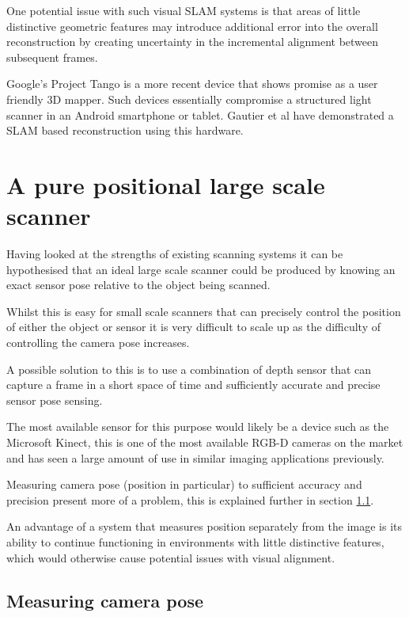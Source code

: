 \documentclass{entcs}
\begin{document}
One potential issue with such visual SLAM systems is that areas of little
distinctive geometric features may introduce additional error into the overall
reconstruction by creating uncertainty in the incremental alignment between
subsequent frames.

Google's Project Tango \cite{ProjectTango} is a more recent device that shows
promise as a user friendly 3D mapper. Such devices essentially compromise a
structured light scanner in an Android smartphone or tablet. Gautier et al
\cite{Gautier2016} have demonstrated a SLAM based reconstruction using this
hardware.

\section{A pure positional large scale scanner}
\label{sec:pure_positional}

Having looked at the strengths of existing scanning systems it can be
hypothesised that an ideal large scale scanner could be produced by knowing an
exact sensor pose relative to the object being scanned.

Whilst this is easy for small scale scanners that can precisely control the
position of either the object or sensor it is very difficult to scale up as the
difficulty of controlling the camera pose increases.

A possible solution to this is to use a combination of depth sensor that can
capture a frame in a short space of time and sufficiently accurate and precise
sensor pose sensing.

The most available sensor for this purpose would likely be a device such as the
Microsoft Kinect, this is one of the most available RGB-D cameras on the market
and has seen a large amount of use in similar imaging applications previously.

Measuring camera pose (position in particular) to sufficient accuracy and
precision present more of a problem, this is explained further in section
\ref{sec:measuring_pose}.

An advantage of a system that measures position separately from the image is its
ability to continue functioning in environments with little distinctive
features, which would otherwise cause potential issues with visual alignment.

\subsection{Measuring camera pose}
\label{sec:measuring_pose}
\end{document}
